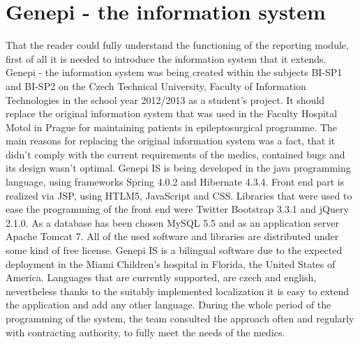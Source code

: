 \documentclass[thesis=B,english]{FITthesis}[2012/10/20]
\begin{document}
\section{Genepi - the information system}
That the reader could fully understand the functioning of the reporting module, first of all it is needed to introduce the information system that it extends. Genepi - the information system was being created within the subjects BI-SP1 and BI-SP2 on the Czech Technical University, Faculty of Information Technologies in the school year 2012/2013 as a student's project. It should replace the original information system that was used in the Faculty Hospital Motol in Prague for maintaining patients in epileptosurgical programme. The main reasons for replacing the original information system was a fact, that it didn't comply with the current requirements of the medics, contained bugs and its design wasn't optimal. Genepi IS is being developed in the java programming language, using frameworks Spring 4.0.2 and Hibernate 4.3.4. Front end part is realized via JSP, using HTLM5, JavaScript and CSS. Libraries that were used to ease the programming of the front end were Twitter Bootstrap 3.3.1 and jQuery 2.1.0. As a database has been chosen MySQL 5.5 and as an application server Apache Tomcat 7. All of the used software and libraries are distributed under some kind of free license. Genepi IS is a bilingual software due to the expected deployment in the Miami Children's hospital in Florida, the United States of America. Languages that are currently supported, are czech and english, nevertheless thanks to the suitably implemented localization it is easy to extend the application and add any other language. During the whole period of the programming of the system, the team consulted the approach often  and regularly with contracting authority, to fully meet the needs of the medics.
\end{document}
